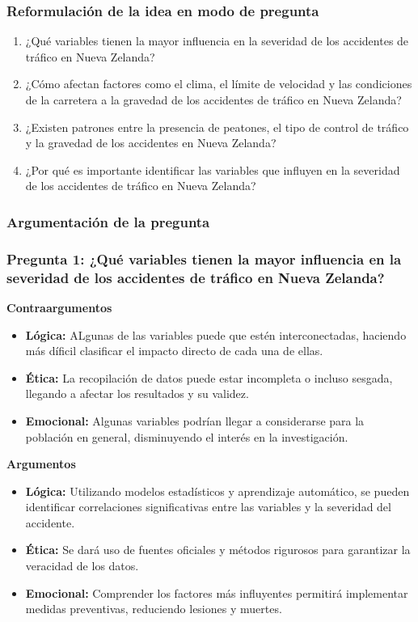 \documentclass{book}
\begin{document}
\subsubsection{Reformulación de la idea en modo de pregunta}

\begin{enumerate}
    \item ¿Qué variables tienen la mayor influencia en la severidad de los accidentes de tráfico en Nueva Zelanda?
    \item ¿Cómo afectan factores como el clima, el límite de velocidad y las condiciones de la carretera a la gravedad de los accidentes de tráfico en Nueva Zelanda?
    \item ¿Existen patrones entre la presencia de peatones, el tipo de control de tráfico y la gravedad de los accidentes en Nueva Zelanda?
    \item ¿Por qué es importante identificar las variables que influyen en la severidad de los accidentes de tráfico en Nueva Zelanda?
\end{enumerate}

\subsubsection{Argumentación de la pregunta}

\subsubsection{Pregunta 1: ¿Qué variables tienen la mayor influencia en la severidad de los accidentes de tráfico en Nueva Zelanda?}

\textbf{Contraargumentos}
\begin{itemize}
    \item \textbf{Lógica:} ALgunas de las variables puede que estén interconectadas, haciendo más díficil clasificar el impacto directo de cada una de ellas.
    \item \textbf{Ética:} La recopilación de datos puede estar incompleta o incluso sesgada, llegando a afectar los resultados y su validez.
    \item \textbf{Emocional:} Algunas variables podrían llegar a considerarse para la población en general, disminuyendo el interés en la investigación.
\end{itemize}

\textbf{Argumentos}
\begin{itemize}
    \item \textbf{Lógica:} Utilizando modelos estadísticos y aprendizaje automático, se pueden identificar correlaciones significativas entre las variables y la severidad del accidente.
    \item \textbf{Ética:} Se dará uso de fuentes oficiales y métodos rigurosos para garantizar la veracidad de los datos.
    \item \textbf{Emocional:} Comprender los factores más influyentes permitirá implementar medidas preventivas, reduciendo lesiones y muertes.
\end{itemize}
\end{document}
